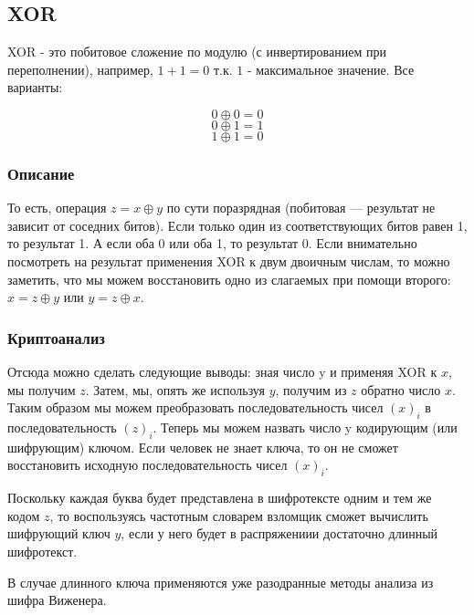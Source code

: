 \subsection{XOR}

XOR - это побитовое сложение по модулю (с инвертированием при переполнении), 
например, $1+1=0$ т.к. $1$ - максимальное значение. Все варианты:

$$0 \oplus 0=0$$
$$0 \oplus 1=1$$
$$1 \oplus 1=0$$

\subsubsection{Описание}
То есть, операция $z = x \oplus y$ по сути поразрядная (побитовая — 
результат не зависит от соседних битов). Если только один из 
соответствующих битов равен 1, то результат 1. А если оба 0 или 
оба 1, то результат 0. Если внимательно посмотреть на результат 
применения XOR к двум двоичным числам, то можно заметить, что 
мы можем восстановить одно из слагаемых при помощи второго: $x 
= z \oplus y$ или $y = z \oplus x$. 

\subsubsection{Криптоанализ}

Отсюда можно сделать следующие выводы: зная число y и применяя 
XOR к $x$, мы получим $z$. Затем, мы, опять же используя $y$, получим 
из $z$ обратно число $x$. Таким образом мы можем преобразовать последовательность 
чисел $(x)_i$ в последовательность $(z)_i$. Теперь мы можем назвать 
число y кодирующим (или шифрующим) ключом. Если человек не знает 
ключа, то он не сможет восстановить исходную последовательность 
чисел $(x)_i$.

Поскольку каждая буква будет представлена в шифротексте 
одним и тем же кодом $z$, то воспользуясь частотным словарем взломщик 
сможет вычислить шифрующий ключ $y$, если у него будет в распряжениии 
достаточно длинный шифротекст. 

В случае длинного ключа применяются уже разодранные методы 
анализа из шифра Виженера.

